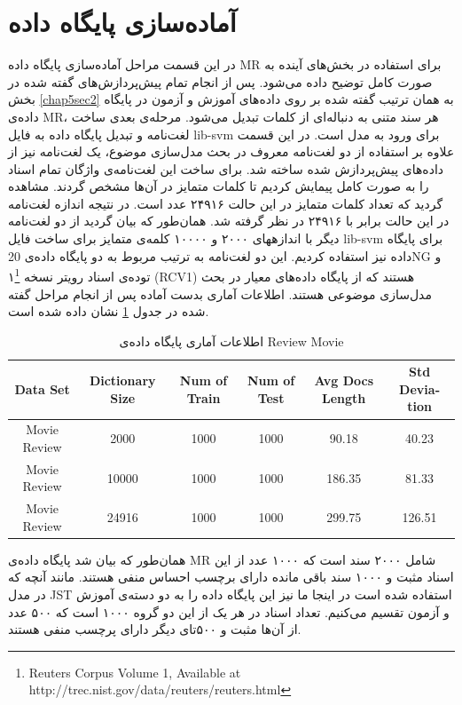 \section{آماده‌سازی پایگاه داده}
\label{chap5sec4}
در این قسمت مراحل آماده‌سازی پایگاه داده
MR
برای استفاده در بخش‌های آینده به صورت کامل توضیح داده می‌‌شود. پس از انجام تمام پیش‌پردازش‌های گفته شده در بخش
\ref{chap5sec2}
به همان ترتیب گفته شده بر روی داده‌های آموزش و آزمون در پایگاه داده‌ی
MR،
 هر سند متنی به دنباله‌ای از کلمات تبدیل می‌‌شود. مرحله‌ی بعدی ساخت لغت‌نامه و تبدیل پایگاه داد‌ه به فایل
lib-svm
برای ورود به مدل است. در این قسمت علاوه بر استفاده از دو لغت‌نامه معروف در بحث مدل‌سازی موضوع، یک لغت‌نامه نیز از داده‌های پیش‌پردازش شده ساخته شد. برای ساخت این لغت‌نامه‌ی واژگان تمام اسناد را به صورت کامل پیمایش کردیم تا کلمات متمایز در آن‌ها مشخص گردند. مشاهده‌ گردید که تعداد کلمات متمایز در این حالت ۲۴۹۱۶ عدد است. در نتیجه اندازه لغت‌نامه در این حالت برابر با ۲۴۹۱۶ در  نظر گرفته شد. همان‌طور که بیان گردید از دو لغت‌نامه دیگر با اندازههای ۲۰۰۰ و ۱۰۰۰۰ کلمه‌ی متمایز برای ساخت فایل
lib-svm
برای پایگاه داده‌ نیز استفاده کردیم. این دو لغت‌نامه به ترتیب مربوط به دو پایگاه داده‌ی 
20NG
و توده‌ی اسناد رویتر نسخه ۱\footnote{Reuters Corpus Volume 1, Available at http://trec.nist.gov/data/reuters/reuters.html}
(RCV1)
هستند که از پایگاه داده‌های معیار در بحث مدل‌سازی موضوعی هستند. اطلاعات آماری بدست آماده پس از انجام مراحل گفته شده در جدول
\ref{chap5-tb1}
نشان داده شده است.

\begin{table}[!t]
	\centering
	\begin{latin}
		\begin{tabular}{|c|c|c|c|c|c|}
			\hline
			Data Set & Dictionary Size & Num of Train & Num of Test & Avg Docs Length & Std Deviation \\
			\hline
			Movie Review & 2000 & 1000 & 1000 & 90.18 & 40.23 \\
			\hline
			Movie Review & 10000 &1000 & 1000 & 186.35 & 81.33 \\
			\hline
			Movie Review & 24916 &1000 & 1000 & 299.75 & 126.51 \\
			\hline
		\end{tabular}
	\end{latin}
	\caption{اطلاعات آماری پایگاه داده‌ی Review Movie}
	\label{chap5-tb1}
\end{table}
همان‌طور که بیان شد پایگاه داده‌ی
MR
شامل ۲۰۰۰ سند است که ۱۰۰۰ عدد از این اسناد مثبت و ۱۰۰۰ سند باقی‌ مانده دارای برچسب احساس منفی‌ هستند. مانند آنچه که در مدل
JST \cite{lin2012weakly}
استفاده شده است در اینجا ما نیز این پایگاه داده را به دو دسته‌ی آموزش و آزمون تقسیم می‌‌کنیم. تعداد اسناد در هر یک از این دو گروه ۱۰۰۰ است که ۵۰۰ عدد از آن‌ها مثبت و ۵۰۰تای دیگر دارای پرچسب منفی‌ هستند.

